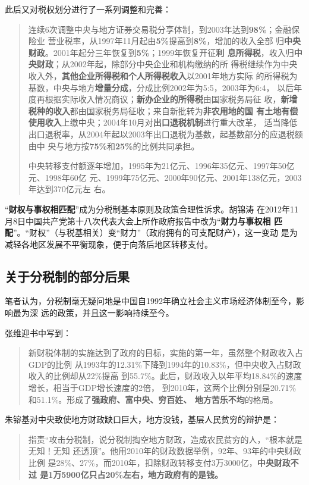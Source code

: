 此后又对税权划分进行了一系列调整和完善：
\begin{quotation}
  连续6次调整中央与地方证券交易税分享体制，到2003年达到\textbf{98\%}；金融保险业
  营业税率，从1997年11月起由\textbf{5\%}提高到\textbf{8\%}，增加的收入全部
  归\textbf{中央财政}。2001年起分三年恢复到\textbf{5\%}；1999年恢复开征\textbf{利
    息所得税}，收入归\textbf{中央财政}；从2002年起，除部分中央企业和机构缴纳的所
  得税继续作为中央收入外，\textbf{其他企业所得税和个人所得税收入}以2001年地方实际
  的所得税为基数，中央与地方\textbf{增量分成}，分成比例2002年为5:5，2003年为6:4，
  以后年度再根据实际收入情况商议；\textbf{新办企业的所得税}由国家税务局征
  收，\textbf{新增税种的收入}都由国家税务局征收；来自新批转为\textbf{非农用地的国
    有土地有偿使用收入}上缴中央；2004年10月对\textbf{出口退税机制}进行重大改革，
  适当降低出口退税率，从2004年起以2003年出口退税为基数，起基数部分的应退税额由中
  央与地方按\textbf{75\%}和\textbf{25\%}的比例共同承担。

  中央转移支付额逐年增加，1995年为21亿元、1996年35亿元、1997年50亿元、1998年60亿
  元、1999年75亿元、2000年90亿元、2001年138亿元，2003年达到370亿元左
  右。\cite{eryuancaizheng}
\end{quotation}

“\textbf{财权与事权相匹配}”成为分税制基本原则及政策合理性诉求。胡锦涛
在2012年11月8日中国共产党第十八次代表大会上所作政府报告中改为“\textbf{财力与事权相
  匹配}”。“财权”（与税基相关）变“财力”（政府拥有的可支配财产），这一变动
是为减轻各地区发展不平衡现象，便于向落后地区转移支付。

\subsection{关于分税制的部分后果}

笔者认为，分税制毫无疑问地是中国自1992年确立社会主义市场经济体制至今，影响最为深
远的政策，并且这一影响持续至今。

张维迎书中写到：
\begin{quotation}
  新财税体制的实施达到了政府的目标，实施的第一年，虽然整个财政收入占GDP的比例
  从1993年的12.31\%下降到1994年的10.83\%，但中央收入占财政收入的比例却从22\%提高
  到55.7\%。此后，财政收入以年平均18.84\%的速度增长，相当于GDP增长速度的2倍，
  到2010年，这两个比例分别是20.71\%和51.1\%。形成了\textbf{强政府、富中央、穷百姓、
    地方苦乐不均}的格局。
\end{quotation}

朱镕基对中央致使地方财政缺口巨大，地方没钱，基层人民贫穷的辩护是：
\begin{quotation}
  指责“攻击分税制，说分税制掏空地方财政，造成农民贫穷的人，“根本就是无知！无知
  还透顶”。他用2010年的财政数据举例，92年、93年的中央财政比例
  是28\%、27\%，而2010年，扣除财政转移支付3万3000亿，\textbf{中央财政不过
    是1万5900亿只占20\%左右，地方政府有的是钱。}
\end{quotation}

